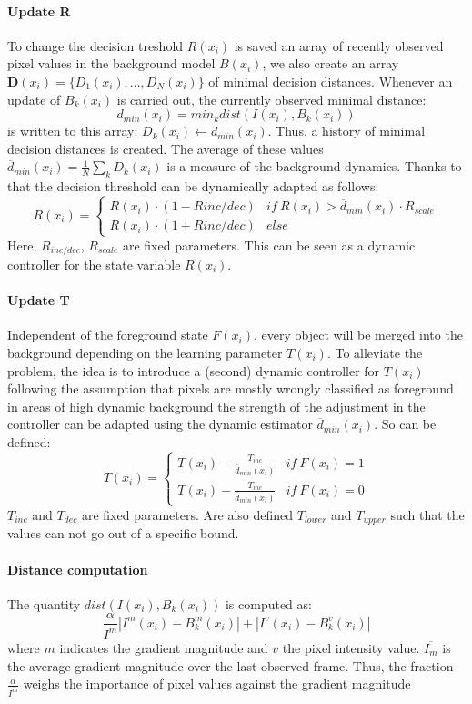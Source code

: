 \paragraph{Update R}
To change the decision treshold $R(x_i)$ is saved an array of recently observed pixel values in the background model $B(x_i)$, we also create an array $\mathbf{D}(x_i) = \{D_1(x_i ),...,D_N(x_i)\}$ of minimal decision distances. Whenever an update of $B_k(x_i)$ is carried out, the currently observed minimal distance:
\[ d_{min}(x_i) = min_k dist(I(x_i), B_k(x_i)) \] is written to this array: $D_k(x_i) \leftarrow d_{min}(x_i)$. Thus, a history of minimal decision distances is created. The average of these values $\overline{d}_{min}(x_i) = \frac{1}{N} \sum_k D_k(x_i)$ is a measure of the background dynamics. Thanks to that
the decision threshold can be dynamically adapted as follows:
\begin{equation}
R(x_i)=\begin{cases} R(x_i)\cdot(1-R{inc/dec}) &if\ R(x_i)> \overline{d}_{min}(x_i)\cdot R_{scale} \\ R(x_i)\cdot (1+R{inc/dec}) &else  \end{cases}
\end{equation}
Here, $R_{inc/dec}$, $R_{scale}$ are fixed parameters. This can be seen as a dynamic controller for the state variable $R(x_i)$.
\paragraph{Update T}
Independent of the foreground state $F(x_i)$, every object will be merged into the background depending on the learning parameter
$T(x_i)$. To alleviate the problem, the idea is to introduce a
(second) dynamic controller for $T(x_i)$ following the assumption that pixels are mostly wrongly classified as foreground in areas of high dynamic background the strength of the adjustment in the controller can be adapted using the dynamic estimator $\overline{d}_{min}(x_i)$. So can be defined:
\begin{equation}
T(x_i)=\begin{cases} T(x_i)+\frac{T_{inc}}{\overline{d}_{min}(x_i)} &if \ F(x_i)=1 \\ T(x_i)-\frac{T_{inc}}{\overline{d}_{min}(x_i)} &if \ F(x_i)=0 \end{cases}
\end{equation}
$T_{inc}$ and $T_{dec}$ are fixed parameters. Are also defined $T_{lower}$ and $T_{upper}$ such that the values can not go out of a specific bound.
\paragraph{Distance computation}
The quantity $ dist(I(x_i),B_k(x_i)) $ is computed as:
\begin{equation}
\frac{\alpha}{\overline{I^m}}|I^m(x_i) - B_k^m(x_i)| + |I^v(x_i) - B_k^v(x_i)|
\end{equation}
where $m$ indicates the gradient magnitude and $v$ the pixel intensity value. $\overline{I_m}$ is the average gradient magnitude over the last observed frame. Thus, the fraction $\frac{\alpha}{\overline{I^m}}$ weighs the importance
of pixel values against the gradient magnitude

